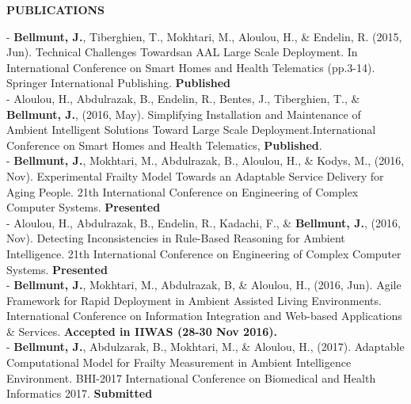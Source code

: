 \documentclass[paper=a4,fontsize=11pt]{temp} %
\begin{document}
\hspace{3mm}
\begin{minipage}{0.04\linewidth}
        \hspace{\linewidth}
		\end{minipage}%
   \begin{minipage}{0.88\linewidth}
   
   \textbf{\textcolor{redCV}{PUBLICATIONS}}
   \vspace{1ex}
    
    - \textbf{Bellmunt, J.}, Tiberghien, T., Mokhtari, M., Aloulou, H., \& Endelin, R. (2015, Jun). Technical Challenges Towardsan AAL Large Scale Deployment. In International Conference on Smart Homes and Health Telematics (pp.3-14). Springer International Publishing. \textbf{Published}\\
    
- Aloulou, H., Abdulrazak, B., Endelin, R., Bentes, J., Tiberghien, T., \& \textbf{Bellmunt, J.}, (2016, May). Simplifying Installation and Maintenance of Ambient Intelligent Solutions Toward Large Scale Deployment.International Conference on Smart Homes and Health Telematics, \textbf{Published}.\\
    
   - \textbf{Bellmunt, J.}, Mokhtari, M., Abdulrazak, B., Aloulou, H., \& Kodys, M., (2016, Nov). Experimental Frailty Model Towards an Adaptable Service Delivery for Aging People. 21th International Conference on Engineering of Complex Computer Systems. \textbf{Presented}\\
   
    - Aloulou, H., Abdulrazak, B., Endelin, R., Kadachi, F., \& \textbf{Bellmunt, J.}, (2016, Nov). Detecting Inconsistencies in Rule-Based Reasoning for Ambient Intelligence. 21th International Conference on Engineering of Complex Computer Systems. \textbf{Presented}\\
    
    - \textbf{Bellmunt, J.}, Mokhtari, M., Abdulrazak, B, \& Aloulou, H., (2016, Jun). Agile Framework for Rapid Deployment in Ambient Assisted Living Environments. International Conference on Information Integration and Web-based Applications \& Services. \textbf{Accepted in IIWAS (28-30 Nov 2016).}\\
    
    - \textbf{Bellmunt, J.}, Abdulzarak, B., Mokhtari, M., \& Aloulou, H., (2017). Adaptable Computational Model for Frailty Measurement in Ambient Intelligence Environment. BHI-2017 International Conference on Biomedical and Health Informatics 2017. \textbf{Submitted}\\
    

\end{minipage}
\end{document}
